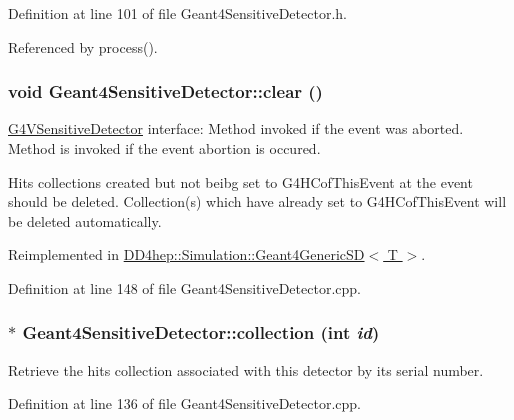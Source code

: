 Definition at line 101 of file Geant4SensitiveDetector.h.

Referenced by process().\hypertarget{class_d_d4hep_1_1_simulation_1_1_geant4_sensitive_detector_a594a8e0083028c98326f99ace2f0f8dd}{
\subsubsection[{clear}]{\setlength{\rightskip}{0pt plus 5cm}void Geant4SensitiveDetector::clear ()}}
\label{class_d_d4hep_1_1_simulation_1_1_geant4_sensitive_detector_a594a8e0083028c98326f99ace2f0f8dd}


\hyperlink{class_g4_v_sensitive_detector}{G4VSensitiveDetector} interface: Method invoked if the event was aborted. Method is invoked if the event abortion is occured.

Hits collections created but not beibg set to G4HCofThisEvent at the event should be deleted. Collection(s) which have already set to G4HCofThisEvent will be deleted automatically. 

Reimplemented in \hyperlink{class_d_d4hep_1_1_simulation_1_1_geant4_generic_s_d_acf8f9146d5683a8131fc5d8ee26d7f01}{DD4hep::Simulation::Geant4GenericSD$<$ T $>$}.

Definition at line 148 of file Geant4SensitiveDetector.cpp.\hypertarget{class_d_d4hep_1_1_simulation_1_1_geant4_sensitive_detector_a29e835271c9efa731bba49c64790281b}{
\subsubsection[{collection}]{ $\ast$ Geant4SensitiveDetector::collection (int {\em id})}}
\label{class_d_d4hep_1_1_simulation_1_1_geant4_sensitive_detector_a29e835271c9efa731bba49c64790281b}


Retrieve the hits collection associated with this detector by its serial number. 

Definition at line 136 of file Geant4SensitiveDetector.cpp.

